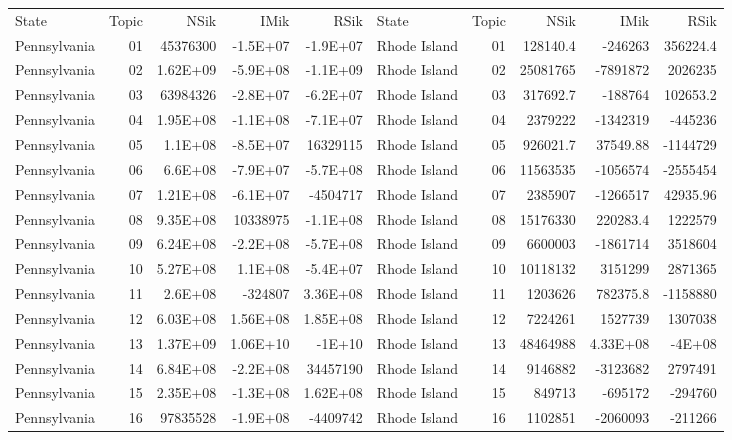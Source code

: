 \begin{table}[]
	\footnotesize
	\begin{tabular}{lrrrrlrrrr}
		State & Topic & NSik & IMik & RSik & State & Topic & NSik & IMik & RSik \\
		Pennsylvania &  01  & 45376300 & -1.5E+07 & -1.9E+07 & Rhode Island &  01  & 128140.4 & -246263 & 356224.4 \\
		Pennsylvania &  02  & 1.62E+09 & -5.9E+08 & -1.1E+09 & Rhode Island &  02  & 25081765 & -7891872 & 2026235 \\
		Pennsylvania &  03  & 63984326 & -2.8E+07 & -6.2E+07 & Rhode Island &  03  & 317692.7 & -188764 & 102653.2 \\
		Pennsylvania &  04  & 1.95E+08 & -1.1E+08 & -7.1E+07 & Rhode Island &  04  & 2379222 & -1342319 & -445236 \\
		Pennsylvania &  05  & 1.1E+08 & -8.5E+07 & 16329115 & Rhode Island &  05  & 926021.7 & 37549.88 & -1144729 \\
		Pennsylvania &  06  & 6.6E+08 & -7.9E+07 & -5.7E+08 & Rhode Island &  06  & 11563535 & -1056574 & -2555454 \\
		Pennsylvania &  07  & 1.21E+08 & -6.1E+07 & -4504717 & Rhode Island &  07  & 2385907 & -1266517 & 42935.96 \\
		Pennsylvania &  08  & 9.35E+08 & 10338975 & -1.1E+08 & Rhode Island &  08  & 15176330 & 220283.4 & 1222579 \\
		Pennsylvania &  09  & 6.24E+08 & -2.2E+08 & -5.7E+08 & Rhode Island &  09  & 6600003 & -1861714 & 3518604 \\
		Pennsylvania &  10 & 5.27E+08 & 1.1E+08 & -5.4E+07 & Rhode Island &  10 & 10118132 & 3151299 & 2871365 \\
		Pennsylvania &  11 & 2.6E+08 & -324807 & 3.36E+08 & Rhode Island &  11 & 1203626 & 782375.8 & -1158880 \\
		Pennsylvania &  12 & 6.03E+08 & 1.56E+08 & 1.85E+08 & Rhode Island &  12 & 7224261 & 1527739 & 1307038 \\
		Pennsylvania &  13 & 1.37E+09 & 1.06E+10 & -1E+10 & Rhode Island &  13 & 48464988 & 4.33E+08 & -4E+08 \\
		Pennsylvania &  14 & 6.84E+08 & -2.2E+08 & 34457190 & Rhode Island &  14 & 9146882 & -3123682 & 2797491 \\
		Pennsylvania &  15 & 2.35E+08 & -1.3E+08 & 1.62E+08 & Rhode Island &  15 & 849713 & -695172 & -294760 \\
		Pennsylvania &  16 & 97835528 & -1.9E+08 & -4409742 & Rhode Island &  16 & 1102851 & -2060093 & -211266 \\

\end{tabular}
\end{table}
